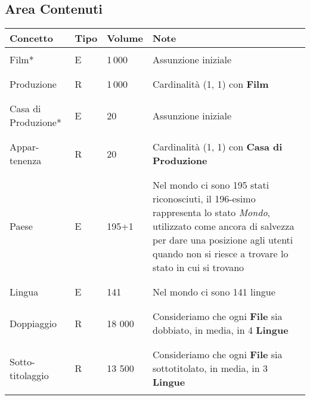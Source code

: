 \documentclass{article}
\begin{document}
\subsection{Area Contenuti}
\begin{tabular}{|C{2.3cm}|C{0.7cm}|C{1.7cm}|C{6.2cm}|}
\hline
    \textbf{Concetto} & \textbf{Tipo} & \textbf{Volume} & \textbf{Note} \\
\hline
\hline
& & & \\
    Film* & E & 1\,000 & Assunzione iniziale \\
& & & \\
\hline
& & & \\
    Produzione & R & 1\,000 & Cardinalità (1, 1) con \textbf{Film} \\
& & & \\
\hline
& & & \\    
Casa di Produzione* & E & 20 & Assunzione iniziale \\
& & & \\
\hline
& & & \\    
    Appar-tenenza & R & 20 & Cardinalità (1, 1) con \textbf{Casa di Produzione} \\
& & & \\
\hline
& & & \\    
    Paese & E & 195+1 & Nel mondo ci sono 195 stati riconosciuti, il 196-esimo rappresenta lo stato \textit{Mondo}, utilizzato come ancora di salvezza per dare una posizione agli utenti quando non si riesce a trovare lo stato in cui si trovano \\
& & & \\
\hline
& & & \\    
    Lingua & E & 141 & Nel mondo ci sono 141 lingue \\
& & & \\
\hline
& & & \\    
    Doppiaggio & R & 18 000 & Consideriamo che ogni \textbf{File} sia dobbiato, in media, in 4 \textbf{Lingue} \\
& & & \\
\hline
& & & \\    
    Sotto-titolaggio & R & 13 500 & Consideriamo che ogni \textbf{File} sia sottotitolato, in media, in 3 \textbf{Lingue} \\
& & & \\
\hline
\end{tabular}
\\ \\ \\ \\
\end{document}
